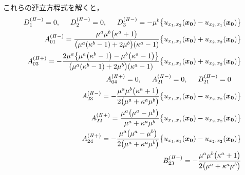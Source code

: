 これらの連立方程式を解くと，
\begin{align}
	D_{1}^{(I\hspace{-.15em}I-)}=0,\hspace{0.5cm}D_{2}^{(I\hspace{-.15em}I-)}=0,
	\hspace{0.5cm}D_{3}^{(I\hspace{-.15em}I-)}=-\mu^{b}\bigl\{u_{x_{1},x_{2}}(\bm{x_{0}})-u_{x_{2},x_{1}}(\bm{x_{0}})\bigr\}&
	\nonumber
	\\
	A_{01}^{(I\hspace{-.15em}I-)}=\frac{\mu^{a}\mu^{b}\bigl(\kappa^{a}+1\bigr)}{\bigl(\mu^{a}(\kappa^{b}-1)+2\mu^{b}\bigr)(\kappa^{a}-1)}
	\bigl\{u_{x_{1},x_{1}}(\bm{x_{0}})+u_{x_{2},x_{2}}(\bm{x_{0}})\bigr\}&
	\nonumber
	\\
	A_{03}^{(I\hspace{-.15em}I+)}=-\frac{2\mu^{a}\bigl\{ \mu^{a}\bigl(\kappa^{b}-1\bigr)-\mu^{b}\bigl(\kappa^{a}-1\bigr)\bigr\}}{\bigl(\mu^{a}(\kappa^{b}-1)+2\mu^{b}\bigr)(\kappa^{a}-1)}
	\bigl\{u_{x_{1},x_{1}}(\bm{x_{0}})+u_{x_{2},x_{2}}(\bm{x_{0}})\bigr\}&
	\nonumber
	\\
	A_{04}^{(I\hspace{-.15em}I+)}=0,\hspace{0.5cm} A_{21}^{(I\hspace{-.15em}I-)}=0,\hspace{0.5cm} B_{21}^{(I\hspace{-.15em}I-)}=0\hspace{0.5cm}&
	\nonumber
	\\
	A_{23}^{(I\hspace{-.15em}I-)}=-\frac{\mu^{a}\mu^{b}\bigl(\kappa^{a}+1\bigr)}{2\bigl(\mu^{a}+\kappa^{a}\mu^{b}\bigr)}
	\bigl\{u_{x_{1},x_{1}}(\bm{x_{0}})-u_{x_{2},x_{2}}(\bm{x_{0}})\bigr\}&
	\nonumber
	\\
	A_{22}^{(I\hspace{-.15em}I+)}=\frac{\mu^{a}\bigl(\mu^{a}-\mu^{b}\bigr)}{\mu^{a}+\kappa^{a}\mu^{b}}
	\bigl\{u_{x_{1},x_{1}}(\bm{x_{0}})-u_{x_{2},x_{2}}(\bm{x_{0}})\bigr\}&
	\nonumber\\
	A_{24}^{(I\hspace{-.15em}I+)}=-\frac{\mu^{a}\bigl(\mu^{a}-\mu^{b}\bigr)}{2\bigl(\mu^{a}+\kappa^{a}\mu^{b}\bigr)}
	\bigl\{u_{x_{1},x_{1}}(\bm{x_{0}})-u_{x_{2},x_{2}}(\bm{x_{0}})\bigr\}&
	\nonumber
	\\
	B_{23}^{(I\hspace{-.15em}I-)}=-\frac{\mu^{a}\mu^{b}\bigl(\kappa^{a}+1\bigr)}{2\bigl(\mu^{a}+\kappa^{a}\mu^{b}\bigr)}

\end{align}
